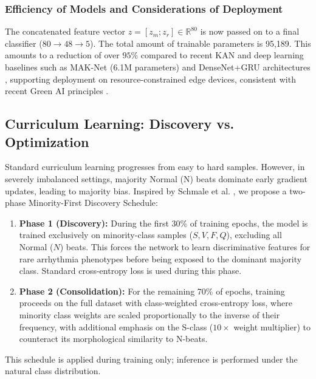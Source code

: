 \documentclass[pdflatex,sn-mathphys-num]{sn-jnl}
\theoremstyle{thmstyleone}
\theoremstyle{thmstyletwo}
\theoremstyle{thmstylethree}
\begin{document}
\subsubsection{Efficiency of Models and Considerations of Deployment}
The concatenated feature vector $z = [z_m; z_r] \in \mathbb{R}^{80}$ is now passed on to a final classifier ($80 \to 48 \to 5$). The total amount of trainable parameters is 95,189. This amounts to a reduction of over $95\%$ compared to recent KAN and deep learning baselines such as MAK-Net (6.1M parameters) \cite{zhao_mak-net_2025} and DenseNet+GRU architectures \cite{guo_inter-patient_2019}, supporting deployment on resource-constrained edge devices, consistent with recent Green AI principles \cite{elsheikhy_lightweight_2025}.

\subsection{Curriculum Learning: Discovery vs. Optimization}
Standard curriculum learning progresses from easy to hard samples. However, in severely imbalanced settings, majority Normal (N) beats dominate early gradient updates, leading to majority bias. Inspired by Schmale et al. \cite{schmale_curriculum_2025}, we propose a two-phase Minority-First Discovery Schedule:

\begin{enumerate}
    \item \textbf{Phase 1 (Discovery):} During the first 30\% of training epochs, the model is trained exclusively on minority-class samples ($S, V, F, Q$), excluding all Normal ($N$) beats. This forces the network to learn discriminative features for rare arrhythmia phenotypes before being exposed to the dominant majority class. Standard cross-entropy loss is used during this phase.
    \item \textbf{Phase 2 (Consolidation):} For the remaining 70\% of epochs, training proceeds on the full dataset with class-weighted cross-entropy loss, where minority class weights are scaled proportionally to the inverse of their frequency, with additional emphasis on the S-class ($10\times$ weight multiplier) to counteract its morphological similarity to N-beats.
\end{enumerate}

\noindent This schedule is applied during training only; inference is performed under the natural class distribution.
\end{document}
